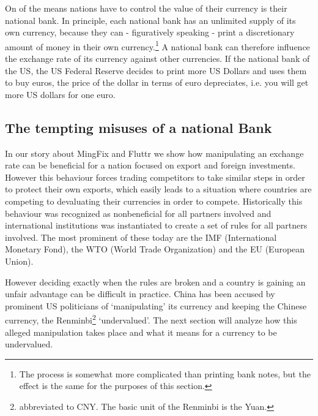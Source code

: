 \documentclass[11pt]{article}
\begin{document}
On of the means nations have to control the value of their currency is 
their national bank. In principle, each national bank has an unlimited 
supply of its own currency, because they can - figuratively speaking - 
print a discretionary amount of money in their own 
currency.\footnote{The process is somewhat more complicated than 
printing bank notes, but the effect is the same for the purposes of this 
section.} A national bank can therefore influence the exchange rate of 
its currency against other currencies. If the national bank of the US, 
the US Federal Reserve decides to print more US Dollars and uses them to 
buy euros, the price of the dollar in terms of euro depreciates, i.e.  
you will get more US dollars for one euro.

\subsection{The tempting misuses of a national Bank}

In our story about MingFix and Fluttr we show how manipulating an 
exchange rate can be beneficial for a nation focused on export and 
foreign investments. However this behaviour forces trading competitors 
to take similar steps in order to protect their own exports, which 
easily leads to a situation where countries are competing to devaluating 
their currencies in order to compete. Historically this behaviour was 
recognized as nonbeneficial for all partners involved and international 
institutions was instantiated to create a set of rules for all partners 
involved. The most prominent of these today are the IMF (International 
Monetary Fond), the WTO (World Trade Organization) and the EU (European 
Union).

However deciding exactly when the rules are broken and a country is 
gaining an unfair advantage can be difficult in practice. China has been 
accused by prominent US politicians of `manipulating' its currency and 
keeping the Chinese currency, the Renminbi\footnote{abbreviated to CNY. 
The basic unit of the Renminbi is the Yuan.} `undervalued'. The next 
section will analyze how this alleged manipulation takes place and what 
it means for a currency to be undervalued.



\end{document}
